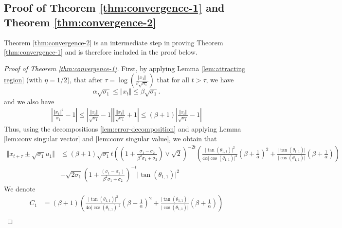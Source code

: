 \subsection{Proof of Theorem \ref{thm:convergence-1} and Theorem \ref{thm:convergence-2}}\label{sec:proof thm1}

Theorem \ref{thm:convergence-2} is an intermediate step in proving Theorem \ref{thm:convergence-1} and is therefore included in the proof below.

\begin{proof}[Proof of Theorem \ref{thm:convergence-1}]
    First, by applying Lemma \ref{lem:attracting region} (with $\eta = 1/2$), that after $\tau = \log(\frac{\Vert x_1 \Vert}{\beta \sqrt{\sigma_1}})$ that for all $t > \tau $, we have 
    $$
    \alpha \sqrt{\sigma_1} \le \Vert x_{t} \Vert \le \beta \sqrt{\sigma_1}.
    $$
    and we also have 
    \begin{align}
        \left\vert \frac{\Vert x_t \Vert^2}{\sigma_1} - 1 \right\vert \le   \left\vert \frac{\Vert x_t \Vert}{\sqrt{\sigma_1}} - 1 \right\vert \left\vert \frac{\Vert x_t \Vert}{\sqrt{\sigma_1}} + 1 \right\vert  \le ( \beta + 1)\left\vert \frac{\Vert x_t \Vert}{\sqrt{\sigma_1}} - 1 \right\vert 
    \end{align}
    Thus, using the decompositions \ref{lem:error-decomposition} and applying Lemma \ref{lem:conv singular vector} and \ref{lem:conv singular value},  we obtain that  
    \begin{align*}
         \Vert x_{t+\tau} \pm \sqrt{\sigma_1} u_1 \Vert & \le (\beta + 1)\sqrt{\sigma_1} t \left( \left(1 + \frac{\sigma_1 - \sigma_2 }{\beta^2 \sigma_1 + \sigma_2}\right) \vee \sqrt{2}  \right)^{-2t} \left(  \frac{\vert \tan(\theta_{1,1})\vert^2}{4\alpha \vert \cos(\theta_{1,1})\vert^2} \left(\beta + \frac{1}{\alpha}\right)^2 + \frac{\vert \tan(\theta_{1,1})\vert}{\vert \cos(\theta_{1,1})\vert}\left(\beta + \frac{1}{\alpha}\right) \right)  \\
         & + \sqrt{2\sigma_1}  \left( 1 + \frac{ (\sigma_1 - \sigma_2)}{ \beta^2 \sigma_1   +  \sigma_2} \right)^{-t} \vert \tan(\theta_{1, 1}) \vert^2
    \end{align*}
    We denote 
    \begin{align*}
           C_1 &= (\beta + 1)\left(  \frac{\vert \tan(\theta_{1,1})\vert^2}{4\alpha \vert \cos(\theta_{1,1})\vert^2} \left(\beta + \frac{1}{\alpha}\right)^2 + \frac{\vert \tan(\theta_{1,1})\vert}{\vert \cos(\theta_{1,1})\vert}\left(\beta + \frac{1}{\alpha}\right) \right) \\

\end{align*}
\end{proof}
